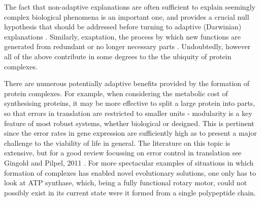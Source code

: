 \documentclass[a4paper,11pt,twoside,openright]{scrbook}
\let\cite\supercite
\begin{document}
The fact that non-adaptive explanations are often sufficient to explain seemingly complex biological phenomena is an important one, and provides a crucial null hypothesis that should be addressed before turning to adaptive (Darwinian) explanations \cite{Koonin2016}. Similarly, exaptation, the process by which new functions are generated from redundant or no longer necessary parts \cite{Gould1979}. Undoubtedly, however all of the above contribute in some degrees to the the ubiquity of protein complexes.

There are numerous potentially adaptive benefits provided by the formation of protein complexes. For example, when considering the metabolic cost of synthesising proteins, it may be more effective to split a large protein into parts, so that errors in translation are restricted to smaller units - modularity is a key feature of most robust systems, whether biological or designed. This is pertinent since the error rates in gene expression are sufficiently high as to present a major challenge to the viability of life in general. The literature on this topic is extensive, but for a good review focussing on error control in translation see Gingold and Pilpel, 2011 \cite{Gingold2011}. For more spectacular examples of situations in which formation of complexes has enabled novel evolutionary solutions, one only has to look at ATP synthase, which, being a fully functional rotary motor, could not possibly exist in its current state were it formed from a single polypeptide chain.
\end{document}

